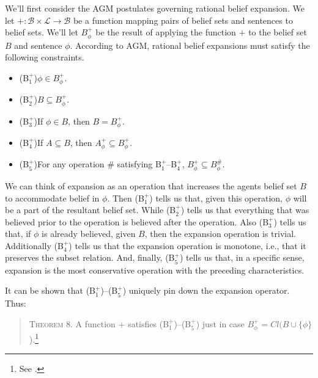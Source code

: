 We'll first consider the AGM postulates governing rational belief expansion.
We let $+: \mathcal{B} \times \mathcal{L} \rightarrow \mathcal{B}$ be a function mapping pairs of belief sets and sentences to belief sets.
We'll let $B^+_\phi$ be the result of applying the function $+$ to the belief set $B$ and sentence $\phi$.
According to AGM, rational belief expansions must satisfy the following constraints.


\begin{itemize}


\item[](B$^+_1$)\quad $\phi \in B^+_\phi$.
\item[](B$^+_2$)\quad $B \subseteq B^+_\phi$.
\item[](B$^+_3$)\quad If $\phi \in B$, then $B = B^+_\phi$.
\item[](B$^+_4$)\quad If $A \subseteq B$, then $A^+_\phi \subseteq B^+_\phi$.
\item[](B$^+_5$)\quad For any operation $\#$ satisfying B$^+_1$--B$^+_4$, $B^+_\phi \subseteq B^\#_\phi$.


\end{itemize}

We can think of expansion as an operation that increases the agents belief set $B$ to accommodate belief in $\phi$.
Then (B$^+_1$) tells us that, given this operation, $\phi$ will be a part of the resultant belief set.
While (B$^+_2$) tells us that everything that was believed prior to the operation is believed after the operation.
Also (B$^+_3$) tells us that, if $\phi$ is already believed, given $B$, then the expansion operation is trivial.
Additionally (B$^+_4$) tells us that the expansion operation is monotone, i.e., that it preserves the subset relation.
And, finally, (B$^+_5$) tells us that, in a specific sense, expansion is the most conservative operation with the preceding characteristics.

It can be shown that (B$^+_1$)--(B$^+_5$) uniquely pin down the expansion operator. 
Thus:
\begin{quote}
\textsc{Theorem 8.}\; A function $+$ satisfies (B$^+_1$)--(B$^+_5$) just in case $B^+_\phi = Cl(B \cup \{ \phi \}$).\footnote{See \citet{Gardenfors1}.}
\end{quote}

